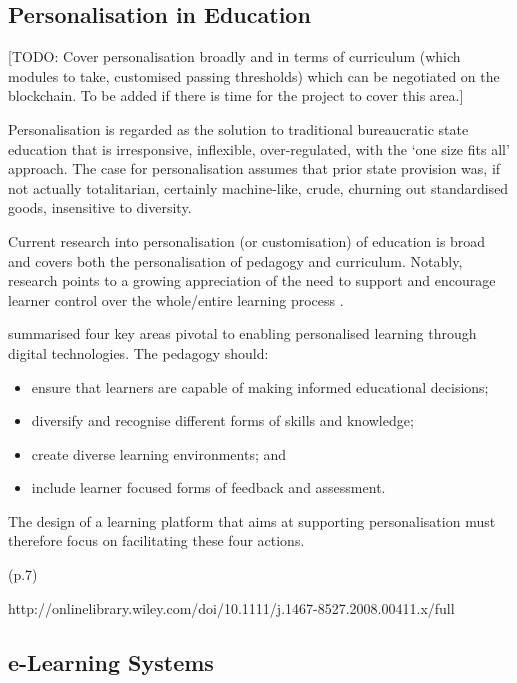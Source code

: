 \subsection{Personalisation in Education}

[TODO: Cover personalisation broadly and in terms of curriculum (which modules to take, 
customised passing thresholds) which can be negotiated on the blockchain.
To be added if there is time for the project to cover this area.]

Personalisation is regarded as the solution to traditional bureaucratic state education that is irresponsive, 
inflexible, over-regulated, with the ‘one size fits all’ approach. The case for personalisation assumes that prior state 
provision was, if not actually totalitarian, certainly machine-like, crude, churning out standardised goods, 
insensitive to diversity. \citep{bragg2014review}

Current research into personalisation (or customisation) of education is broad and covers both the personalisation 
of pedagogy and curriculum. Notably, research points to a growing appreciation of the need to support and 
encourage learner control over the whole/entire learning process \citep{dron2007designing}.

\citet{green2005futurelab} summarised four key areas pivotal to enabling personalised learning through digital 
technologies. The pedagogy should:

\begin{itemize}
    \setlength\itemsep{0em}    
    \item ensure that learners are capable of making informed educational decisions;
    \item diversify and recognise different forms of skills and knowledge;
    \item create diverse learning environments; and
    \item include learner focused forms of feedback and assessment.
\end{itemize}

The design of a learning platform that aims at supporting personalisation must therefore focus on facilitating these 
four actions.


(p.7)

http://onlinelibrary.wiley.com/doi/10.1111/j.1467-8527.2008.00411.x/full

\subsection{e-Learning Systems}

